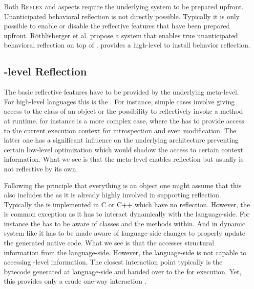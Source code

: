 Both \textsc{Reflex} and aspects require the underlying system to be prepared upfront.
Unanticipated behavioral reflection is not directly possible.
Typically it is only possible to enable or disable the reflective features that have been prepared upfront.
Röthlisberger et al. propose \Gepetto a system \cite{Roet07b} that enables true unanticipated behavioral reflection on top of \ST.
\Gepetto provides a high-level \API to install behavior reflection.

\subsection{\VM-level Reflection}
The basic reflective features have to be provided by the underlying meta-level.
For high-level languages this is the \VM.
For instance, simple cases involve giving access to the class of an object or the possibility to reflectively invoke a method at runtime.
\PH for instance is a more complex case, where the \VM has to provide access to the current execution context for introspection and even modification.
The latter one has a significant influence on the underlying \VM architecture preventing certain low-level optimization which would shadow the access to certain context information.
What we see is that the meta-level enables reflection but usually is not reflective by its own.

Following the \ST principle that everything is an object one might assume that this also includes the \VM as it is already highly involved in supporting reflection.
Typically the \VM is implemented in C or C++ which have no reflection.
However, the \JIT is common exception as it has to interact dynamically with the language-side.
For instance the \JIT has to be aware of classes and the methods within.
And in dynamic system like \PH it has to be made aware of language-side changes to properly update the generated native code.
What we see is that the \JIT accesses structural information from the language-side.
However, the language-side is not capable to accessing \VM-level information.
The closest \VM interaction point typically is the bytecode generated at language-side and handed over to the \VM for execution.
Yet, this provides only a crude one-way interaction \cite{Kell12a}.

